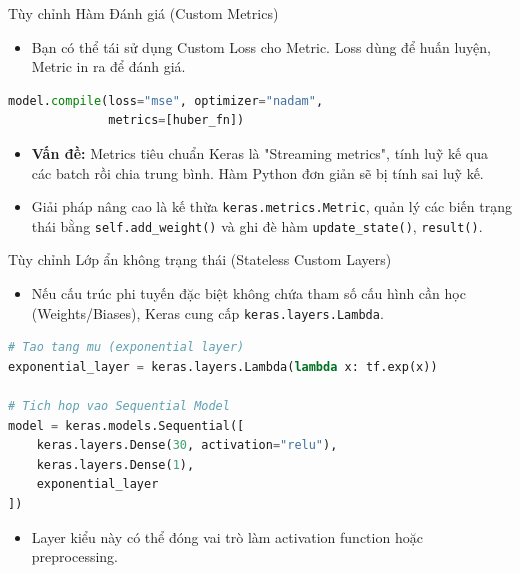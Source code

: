 \documentclass[aspectratio=169]{beamer}
\begin{document}
\begin{frame}[fragile]{Tùy chỉnh Hàm Đánh giá (Custom Metrics)}
    \begin{itemize}
        \item Bạn có thể tái sử dụng Custom Loss cho Metric. Loss dùng để huấn luyện, Metric in ra để đánh giá.
    \end{itemize}
    \begin{lstlisting}[language=Python]
model.compile(loss="mse", optimizer="nadam", 
              metrics=[huber_fn])
    \end{lstlisting}
    \begin{itemize}
        \item \textbf{Vấn đề:} Metrics tiêu chuẩn Keras là "Streaming metrics", tính luỹ kế qua các batch rồi chia trung bình. Hàm Python đơn giản sẽ bị tính sai luỹ kế.
        \item Giải pháp nâng cao là kế thừa \texttt{keras.metrics.Metric}, quản lý các biến trạng thái bằng \texttt{self.add\_weight()} và ghi đè hàm \texttt{update\_state()}, \texttt{result()}.
    \end{itemize}
\end{frame}

\begin{frame}[fragile]{Tùy chỉnh Lớp ẩn không trạng thái (Stateless Custom Layers)}
    \begin{itemize}
        \item Nếu cấu trúc phi tuyến đặc biệt không chứa tham số cấu hình cần học (Weights/Biases), Keras cung cấp \texttt{keras.layers.Lambda}.
    \end{itemize}
    \begin{lstlisting}[language=Python]
# Tao tang mu (exponential layer)
exponential_layer = keras.layers.Lambda(lambda x: tf.exp(x))

# Tich hop vao Sequential Model
model = keras.models.Sequential([
    keras.layers.Dense(30, activation="relu"),
    keras.layers.Dense(1),
    exponential_layer
])
    \end{lstlisting}
    \begin{itemize}
        \item Layer kiểu này có thể đóng vai trò làm activation function hoặc preprocessing.
    \end{itemize}
\end{frame}
\end{document}
